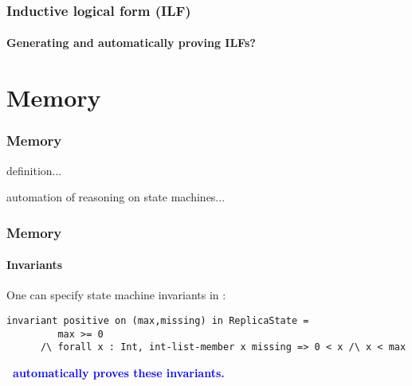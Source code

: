 \documentclass[12pt,red]{beamer}
\newcommand{\cemph}[1]{\textcolor{blue}{\textbf{#1}}}
\renewcommand{\mdownarrow}[1]{}
\begin{document}


\begin{frame}
  \frametitle{Inductive logical form (ILF)}

  \framesubtitle{Generating and automatically proving ILFs?}

\end{frame}


\section{Memory}


\begin{frame}[fragile]
  \frametitle{Memory}

  definition...

  automation of reasoning on state machines...
\end{frame}


\begin{frame}[fragile]
  \frametitle{Memory}

  \framesubtitle{Invariants}

  One can specify state machine invariants in \eml:
  \begin{lstlisting}[basicstyle=\tiny]
    invariant positive on (max,missing) in ReplicaState =
         max >= 0
      /\ forall x : Int, int-list-member x missing => 0 < x /\ x < max
  \end{lstlisting}

  \vspace{0.1in}

  \cemph{\nuprl\ automatically proves these invariants.}
\end{frame}
\end{document}
